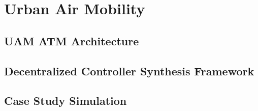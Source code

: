 








%




\chapter{Urban Air Mobility}


%
%
\section{UAM ATM Architecture} \label{sec:Motivation}




%
\section{Decentralized Controller Synthesis Framework}\label{sec:distshield}

%
%
\section{Case Study Simulation}\label{sec:experiments}

%

